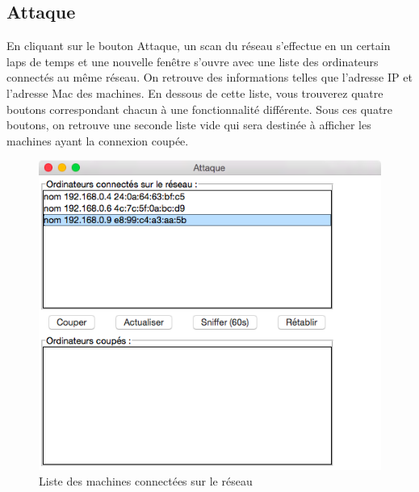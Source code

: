 \documentclass[11pt]{article}
\begin{document}
\subsection{Attaque}
En cliquant sur le bouton Attaque, un scan du réseau s'effectue en un certain laps de temps et une nouvelle fenêtre s'ouvre avec une liste des ordinateurs connectés au même réseau. On retrouve des informations telles que l'adresse IP et l'adresse Mac des machines. En dessous de cette liste, vous trouverez quatre boutons  correspondant chacun à une fonctionnalité différente. Sous ces quatre boutons, on retrouve une seconde liste vide qui sera destinée à afficher les machines ayant la connexion coupée.
\begin{figure}[!h]
\centering
\includegraphics[scale=0.5]{./Captures/identificationFen.png}
\caption{Liste des machines connectées sur le réseau}
\end{figure}
\end{document}
